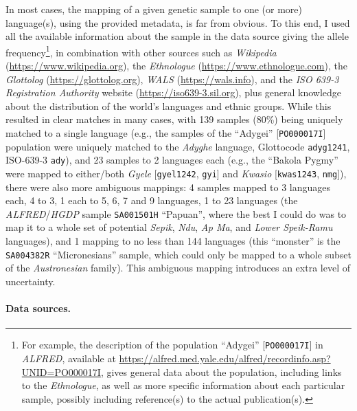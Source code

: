 \documentclass[twoside,onecolumn]{article}
\begin{document}
In most cases, the mapping of a given genetic sample to one (or more) language(s), using the provided metadata, is far from obvious.
To this end, I used all the available information about the sample in the data source giving the allele frequency\footnote{For example, the description of the population ``Adygei'' [\texttt{PO000017I}] in \textit{ALFRED}, available at \url{https://alfred.med.yale.edu/alfred/recordinfo.asp?UNID=PO000017I}, gives general data about the population, including links to the \textit{Ethnologue}, as well as more specific information about each particular sample, possibly including reference(s) to the actual publication(s).}, in combination with other sources such as \textit{Wikipedia} (\url{https://www.wikipedia.org}), the \textit{Ethnologue} (\url{https://www.ethnologue.com}), the \textit{Glottolog} (\url{https://glottolog.org}), \textit{WALS} (\url{https://wals.info}), and the \textit{ISO 639-3 Registration Authority} website (\url{https://iso639-3.sil.org}), plus general knowledge about the distribution of the world's languages and ethnic groups.
While this resulted in clear matches in many cases, with 139 samples (80\%) being uniquely matched to a single language (e.g., the samples of the ``Adygei'' [\texttt{PO000017I}] population were uniquely matched to the \textit{Adyghe} language, Glottocode \texttt{adyg1241}, ISO-639-3 \texttt{ady}), and 23 samples to 2 languages each (e.g., the ``Bakola Pygmy'' were mapped to either/both \textit{Gyele} [\texttt{gyel1242}, \texttt{gyi}] and \textit{Kwasio} [\texttt{kwas1243}, \texttt{nmg}]), there were also more ambiguous mappings: 4 samples mapped to 3 languages each, 4 to 3, 1 each to 5, 6, 7 and 9 languages, 1 to 23 languages (the \textit{ALFRED}/\textit{HGDP} sample \texttt{SA001501H} ``Papuan'', where the best I could do was to map it to a whole set of potential \textit{Sepik}, \textit{Ndu}, \textit{Ap Ma}, and\textit{ Lower Speik-Ramu} languages), and 1 mapping to no less than 144 languages (this ``monster'' is the \texttt{SA004382R} ``Micronesians'' sample, which could only be mapped to a whole subset of the \textit{Austronesian} family).
This ambiguous mapping introduces an extra level of uncertainty.

\paragraph{Data sources.}
\end{document}
